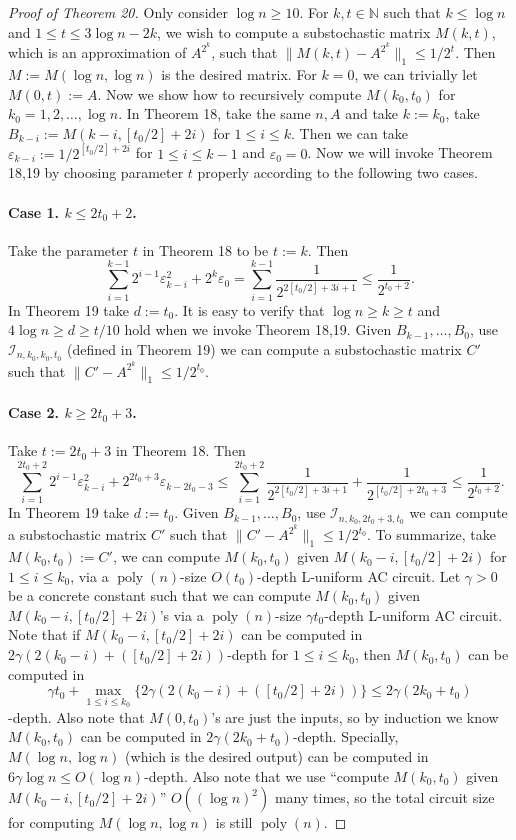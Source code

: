 \begin{proof}[Proof of Theorem 20]
Only consider $\log n\ge10$. For $k,t\in\mathbb N$ such that $k\le\log n$ and $1\le t\le3\log n-2k$, we wish to compute a substochastic matrix $M(k,t)$, which is an approximation of $A^{2^k}$, such that $\|M(k,t)-A^{2^k}\|_1\le1/2^t$. Then $M:=M(\log n,\log n)$ is the desired matrix.
For $k=0$, we can trivially let $M(0,t):=A$. Now we show how to recursively compute $M(k_0,t_0)$ for $k_0=1,2,\ldots,\log n$.
In Theorem 18, take the same $n,A$ and take $k:=k_0$, take $B_{k-i}:=M(k-i,[t_0/2]+2i)$ for $1\le i\le k$. Then we can take $\varepsilon_{k-i}:=1/2^{[t_0/2]+2i}$ for $1\le i\le k-1$ and $\varepsilon_0=0$. Now we will invoke Theorem 18,19 by choosing parameter $t$ properly according to the following two cases.
\paragraph{Case 1. $k\le2t_0+2$.}
Take the parameter $t$ in Theorem 18 to be $t:=k$. Then
\[\sum_{i=1}^{k-1}2^{i-1}\varepsilon_{k-i}^2+2^k\varepsilon_0=\sum_{i=1}^{k-1}\frac1{2^{2[t_0/2]+3i+1}}\le\frac1{2^{t_0+2}}.\]
In Theorem 19 take $d:=t_0$. It is easy to verify that $\log n\ge k\ge t$ and $4\log n\ge d\ge t/10$ hold when we invoke Theorem 18,19. Given $B_{k-1},\ldots,B_0$, use $\mathcal I_{n,k_0,k_0,t_0}$ (defined in Theorem 19) we can compute a substochastic matrix $C'$ such that $\|C'-A^{2^k}\|_1\le1/2^{t_0}$.
\paragraph{Case 2. $k\ge2t_0+3$.}
Take $t:=2t_0+3$ in Theorem 18. Then
\[\sum_{i=1}^{2t_0+2}2^{i-1}\varepsilon_{k-i}^2+2^{2t_0+3}\varepsilon_{k-2t_0-3}\le\sum_{i=1}^{2t_0+2}\frac1{2^{2[t_0/2]+3i+1}}+\frac1{2^{[t_0/2]+2t_0+3}}\le\frac1{2^{t_0+2}}.\]
In Theorem 19 take $d:=t_0$. Given $B_{k-1},\ldots,B_0$, use $\mathcal I_{n,k_0,2t_0+3,t_0}$ we can compute a substochastic matrix $C'$ such that $\|C'-A^{2^k}\|_1\le1/2^{t_0}$.
To summarize, take $M(k_0,t_0):=C'$, we can compute $M(k_0,t_0)$ given $M(k_0-i,[t_0/2]+2i)$ for $1\le i\le k_0$, via a $\operatorname{poly}(n)$-size $O(t_0)$-depth L-uniform AC circuit.
Let $\gamma>0$ be a concrete constant such that we can compute $M(k_0,t_0)$ given $M(k_0-i,[t_0/2]+2i)$'s via a $\operatorname{poly}(n)$-size $\gamma t_0$-depth L-uniform AC circuit. Note that if $M(k_0-i,[t_0/2]+2i)$ can be computed in $2\gamma(2(k_0-i)+([t_0/2]+2i))$-depth for $1\le i\le k_0$, then $M(k_0,t_0)$ can be computed in
\[\gamma t_0+\max_{1\le i\le k_0}\{2\gamma(2(k_0-i)+([t_0/2]+2i))\}\le2\gamma(2k_0+t_0)\]
-depth. Also note that $M(0,t_0)$'s are just the inputs, so by induction we know $M(k_0,t_0)$ can be computed in $2\gamma(2k_0+t_0)$-depth. Specially, $M(\log n,\log n)$ (which is the desired output) can be computed in $6\gamma\log n\le O(\log n)$-depth. Also note that we use ``compute $M(k_0,t_0)$ given $M(k_0-i,[t_0/2]+2i)$'' $O((\log n)^2)$ many times, so the total circuit size for computing $M(\log n,\log n)$ is still $\operatorname{poly}(n)$.
\end{proof}
